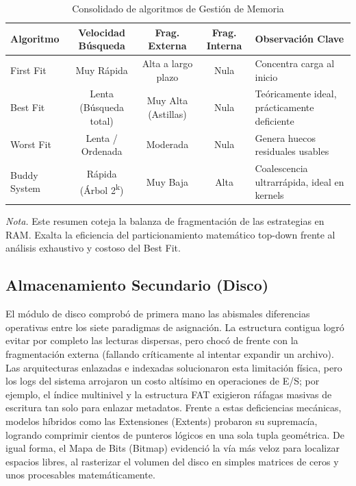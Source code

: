 \documentclass[12pt,a4paper]{article}
\begin{document}
\begin{table}[H]
\centering\small
\caption{Consolidado de algoritmos de Gestión de Memoria}
\label{tab:comp_mem}
\begin{tabularx}{\textwidth}{X c c c X}
\toprule
\textbf{Algoritmo} & \textbf{Velocidad Búsqueda} & \textbf{Frag. Externa} & \textbf{Frag. Interna} & \textbf{Observación Clave} \\
\midrule
First Fit & Muy Rápida & Alta a largo plazo & Nula & Concentra carga al inicio \\
Best Fit & Lenta (Búsqueda total) & Muy Alta (Astillas) & Nula & Teóricamente ideal, prácticamente deficiente \\
Worst Fit & Lenta / Ordenada & Moderada & Nula & Genera huecos residuales usables \\
Buddy System & Rápida (Árbol 2\textsuperscript{k}) & Muy Baja & Alta & Coalescencia ultrarrápida, ideal en kernels \\
\bottomrule
\end{tabularx}
    \par\vspace{0.2cm}\raggedright \textit{Nota.} Este resumen coteja la balanza de fragmentación de las estrategias en RAM. Exalta la eficiencia del particionamiento matemático top-down frente al análisis exhaustivo y costoso del Best Fit.
\end{table}

\subsection{Almacenamiento Secundario (Disco)}
El módulo de disco comprobó de primera mano las abismales diferencias operativas entre los siete paradigmas de asignación. La estructura contigua logró evitar por completo las lecturas dispersas, pero chocó de frente con la fragmentación externa (fallando críticamente al intentar expandir un archivo). Las arquitecturas enlazadas e indexadas solucionaron esta limitación física, pero los logs del sistema arrojaron un costo altísimo en operaciones de E/S; por ejemplo, el índice multinivel y la estructura FAT exigieron ráfagas masivas de escritura tan solo para enlazar metadatos. Frente a estas deficiencias mecánicas, modelos híbridos como las Extensiones (Extents) probaron su supremacía, logrando comprimir cientos de punteros lógicos en una sola tupla geométrica. De igual forma, el Mapa de Bits (Bitmap) evidenció la vía más veloz para localizar espacios libres, al rasterizar el volumen del disco en simples matrices de ceros y unos procesables matemáticamente.
\end{document}
